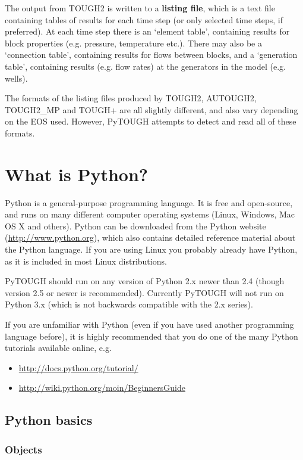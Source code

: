The output from TOUGH2 is written to a \textbf{listing file}, which is a text file containing tables of results for each time step (or only selected time steps, if preferred).  At each time step there is an `element table', containing results for block properties (e.g. pressure, temperature etc.).  There may also be a `connection table', containing results for flows between blocks, and a `generation table', containing results (e.g. flow rates) at the generators in the model (e.g. wells).

The formats of the listing files produced by TOUGH2, AUTOUGH2, TOUGH2\_MP and TOUGH+ are all slightly different, and also vary depending on the EOS used.  However, PyTOUGH attempts to detect and read all of these formats.

\section{What is Python?}

Python is a general-purpose programming language.  It is free and open-source, and runs on many different computer operating systems (Linux, Windows, Mac OS X and others).  Python can be downloaded from the Python website (\url{http://www.python.org}), which also contains detailed reference material about the Python language.  If you are using Linux you probably already have Python, as it is included in most Linux distributions.

PyTOUGH should run on any version of Python 2.x newer than 2.4 (though version 2.5 or newer is recommended).  Currently PyTOUGH will not run on Python 3.x (which is not backwards compatible with the 2.x series).

If you are unfamiliar with Python (even if you have used another programming language before), it is highly recommended that you do one of the many Python tutorials available online, e.g.

\begin{itemize}
  \item \url{http://docs.python.org/tutorial/}
  \item \url{http://wiki.python.org/moin/BeginnersGuide}
\end{itemize}

\subsection{Python basics}

\subsubsection{Objects}

